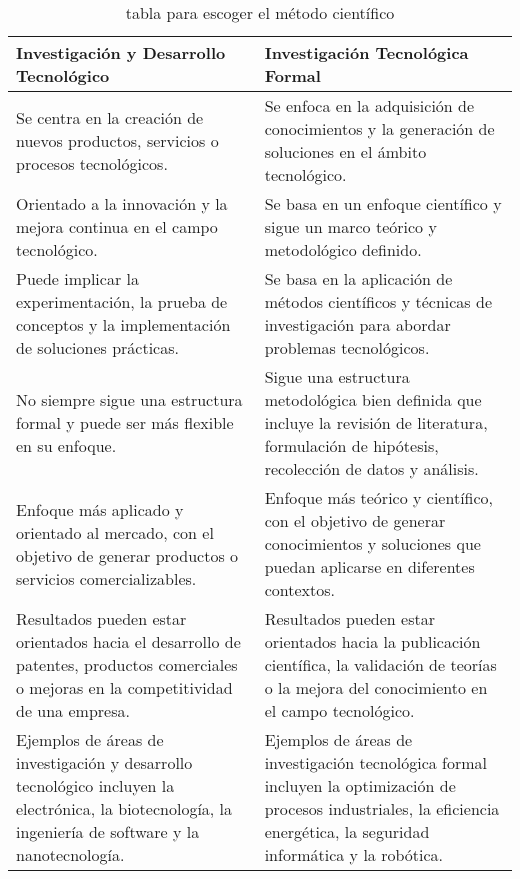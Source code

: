 \documentclass[12pt,a4paper]{article}
\begin{document}
\begin{table}[h]
    \centering
    \begin{tabular}{| p{7cm}| p{7cm} |} 
    \hline
    \textbf{Investigación y Desarrollo Tecnológico} & \textbf{Investigación Tecnológica Formal} \\
    \hline
    Se centra en la creación de nuevos productos, servicios o procesos tecnológicos. & Se enfoca en la adquisición de conocimientos y la generación de soluciones en el ámbito tecnológico. \\
    \hline
    Orientado a la innovación y la mejora continua en el campo tecnológico. & Se basa en un enfoque científico y sigue un marco teórico y metodológico definido. \\
    \hline
    Puede implicar la experimentación, la prueba de conceptos y la implementación de soluciones prácticas. & Se basa en la aplicación de métodos científicos y técnicas de investigación para abordar problemas tecnológicos. \\
    \hline
    No siempre sigue una estructura formal y puede ser más flexible en su enfoque. & Sigue una estructura metodológica bien definida que incluye la revisión de literatura, formulación de hipótesis, recolección de datos y análisis. \\
    \hline
    Enfoque más aplicado y orientado al mercado, con el objetivo de generar productos o servicios comercializables. & Enfoque más teórico y científico, con el objetivo de generar conocimientos y soluciones que puedan aplicarse en diferentes contextos. \\
    \hline
    Resultados pueden estar orientados hacia el desarrollo de patentes, productos comerciales o mejoras en la competitividad de una empresa. & Resultados pueden estar orientados hacia la publicación científica, la validación de teorías o la mejora del conocimiento en el campo tecnológico. \\
    \hline
    Ejemplos de áreas de investigación y desarrollo tecnológico incluyen la electrónica, la biotecnología, la ingeniería de software y la nanotecnología. & Ejemplos de áreas de investigación tecnológica formal incluyen la optimización de procesos industriales, la eficiencia energética, la seguridad informática y la robótica. \\
    \hline
\end{tabular}
    \caption{tabla para escoger el método científico}
\end{table}
    
\end{document}
